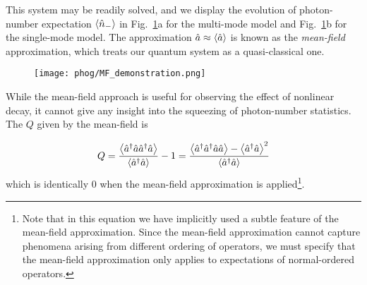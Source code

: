 This system may be readily solved, and we display the evolution of photon-number expectation $\ev{\hat{n}_-}$ in Fig.~\ref{fig:phog_MF_demonstration}a for the multi-mode model and Fig.~\ref{fig:phog_MF_demonstration}b for the single-mode model. The approximation $\hat{a} \approx \ev{\hat{a}}$ is known as the \emph{mean-field} approximation, which treats our quantum system as a quasi-classical one.

\begin{figure}[htp]
\centering
\texttt{[image: phog/MF\_demonstration.png]}
\caption{\label{fig:phog_MF_demonstration}}
\end{figure}
%

While the mean-field approach is useful for observing the effect of nonlinear decay, it cannot give any insight into the squeezing of photon-number statistics. The $Q$ given by the mean-field is 

\begin{equation}
Q = \frac{\ev{\hat{a}^\dagger \hat{a} \hat{a}^\dagger \hat{a}}}{\ev{\hat{a}^\dagger \hat{a}}} - 1 = \frac{\ev{\hat{a}^\dagger \hat{a}^\dagger \hat{a} \hat{a}} - \ev{\hat{a}^\dagger \hat{a}}^2}{\ev{\hat{a}^\dagger \hat{a}}}
\end{equation}
which is identically $0$ when the mean-field approximation is applied\footnote{Note that in this equation we have implicitly used a subtle feature of the mean-field approximation. Since the mean-field approximation cannot capture phenomena arising from different ordering of operators, we must specify that the mean-field approximation only applies to expectations of normal-ordered operators.}.

